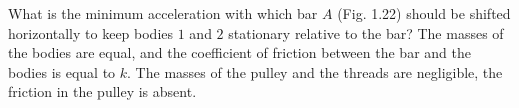\item What is the minimum acceleration with which bar \( A \) (Fig. 1.22) should be shifted horizontally to keep bodies \( 1 \) and \( 2 \) stationary relative to the bar? The masses of the bodies are equal, and the coefficient of friction between the bar and the bodies is equal to \( k \). The masses of the pulley and the threads are negligible, the friction in the pulley is absent.
    \begin{center}
    \end{center}